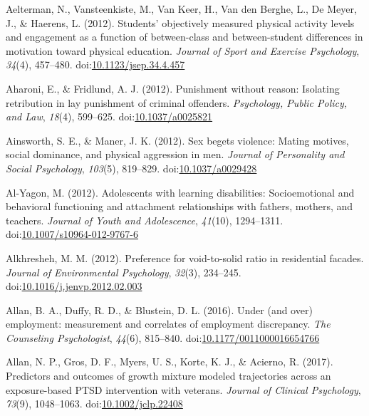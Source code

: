 \documentclass[english,man]{apa6}
\begin{document}
\hypertarget{ref-Aelterman2012}{}
Aelterman, N., Vansteenkiste, M., Van Keer, H., Van den Berghe, L., De
Meyer, J., \& Haerens, L. (2012). Students' objectively measured
physical activity levels and engagement as a function of between-class
and between-student differences in motivation toward physical education.
\emph{Journal of Sport and Exercise Psychology}, \emph{34}(4), 457--480.
doi:\href{https://doi.org/10.1123/jsep.34.4.457}{10.1123/jsep.34.4.457}

\hypertarget{ref-Aharoni2012}{}
Aharoni, E., \& Fridlund, A. J. (2012). Punishment without reason:
Isolating retribution in lay punishment of criminal offenders.
\emph{Psychology, Public Policy, and Law}, \emph{18}(4), 599--625.
doi:\href{https://doi.org/10.1037/a0025821}{10.1037/a0025821}

\hypertarget{ref-Ainsworth}{}
Ainsworth, S. E., \& Maner, J. K. (2012). Sex begets violence: Mating
motives, social dominance, and physical aggression in men. \emph{Journal
of Personality and Social Psychology}, \emph{103}(5), 819--829.
doi:\href{https://doi.org/10.1037/a0029428}{10.1037/a0029428}

\hypertarget{ref-Al-Yagon2012}{}
Al-Yagon, M. (2012). Adolescents with learning disabilities:
Socioemotional and behavioral functioning and attachment relationships
with fathers, mothers, and teachers. \emph{Journal of Youth and
Adolescence}, \emph{41}(10), 1294--1311.
doi:\href{https://doi.org/10.1007/s10964-012-9767-6}{10.1007/s10964-012-9767-6}

\hypertarget{ref-Alkhresheh2012}{}
Alkhresheh, M. M. (2012). Preference for void-to-solid ratio in
residential facades. \emph{Journal of Environmental Psychology},
\emph{32}(3), 234--245.
doi:\href{https://doi.org/10.1016/j.jenvp.2012.02.003}{10.1016/j.jenvp.2012.02.003}

\hypertarget{ref-Allan2016}{}
Allan, B. A., Duffy, R. D., \& Blustein, D. L. (2016). Under (and over)
employment: measurement and correlates of employment discrepancy.
\emph{The Counseling Psychologist}, \emph{44}(6), 815--840.
doi:\href{https://doi.org/10.1177/0011000016654766}{10.1177/0011000016654766}

\hypertarget{ref-Allan2017}{}
Allan, N. P., Gros, D. F., Myers, U. S., Korte, K. J., \& Acierno, R.
(2017). Predictors and outcomes of growth mixture modeled trajectories
across an exposure-based PTSD intervention with veterans. \emph{Journal
of Clinical Psychology}, \emph{73}(9), 1048--1063.
doi:\href{https://doi.org/10.1002/jclp.22408}{10.1002/jclp.22408}
\end{document}
